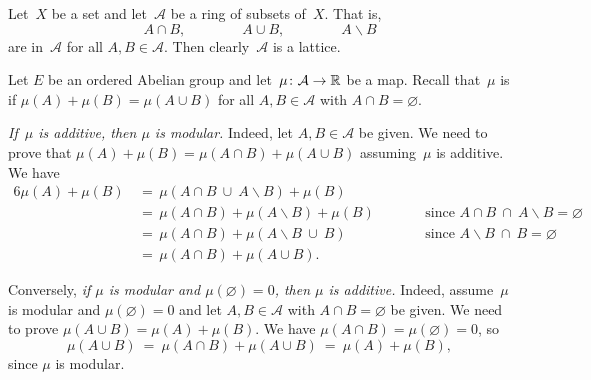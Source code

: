\documentclass[main.tex]{subfiles}
\begin{document}
\begin{ex}
Let~$X$ be a set and let~$\mathcal{A}$ be a ring of subsets of~$X$.
That is,
\begin{equation*}
A\cap B,\qquad\qquad A\cup B,\qquad\qquad A\backslash B
\end{equation*}
are in~$\mathcal{A}$ for all $A,B\in\mathcal{A}$.
Then clearly~$\mathcal{A}$ is a lattice.

Let $E$ be an ordered Abelian group
and let~$\mu\colon \mathcal{A}\rightarrow \mathbb{R}$ be a map.
Recall that~$\mu$ is  if $\mu(A) + \mu(B) = \mu(A\cup B)$
for all $A,B\in\mathcal{A}$ with $A\cap B=\varnothing$.

\emph{If~$\mu$ is additive,
then $\mu$ is modular.}
Indeed,
let $A,B\in \mathcal{A}$ be given. We need to prove that
$\mu(A) + \mu(B) =\mu(A\cap B) + \mu(A\cup B)$
assuming~$\mu$ is additive.
We have
\begin{alignat*}{6}
\mu(A) + \mu(B) \,
  & =\, \mu(A\cap B \ \cup\ A\backslash B) + \mu(B) \\ 
  & =\, \mu(A\cap B) + \mu(A\backslash B)  + \mu(B)\qquad
    && \text{since } A\cap B \ \cap\ A\backslash B = \varnothing \\ 
  & =\, \mu(A\cap B) + \mu(A\backslash B \ \cup\ B ) 
    && \text{since } A\backslash B\ \cap\ B = \varnothing \\
  & =\, \mu(A\cap B) + \mu(A\cup B).
\end{alignat*}

Conversely,
\emph{if $\mu$ is modular
and $\mu(\varnothing) = 0$,
then $\mu$ is additive.}
Indeed,
assume~$\mu$ is modular and $\mu(\varnothing)=0$
and let $A,B\in\mathcal{A}$
with $A\cap B = \varnothing$ be given.
We need to prove $\mu(A\cup B) = \mu(A) + \mu(B)$.
We have $\mu(A\cap B) = \mu(\varnothing) = 0$,
so 
\begin{equation*}
\mu(A\cup B) \ =\  \mu(A\cap B) + \mu(A\cup B) \ =\  \mu(A) + \mu(B),
\end{equation*}
since $\mu$ is modular.
\end{ex}
%
%
\end{document}
